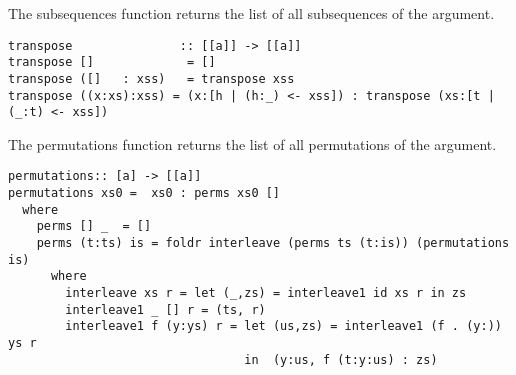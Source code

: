 The subsequences function returns the list of all subsequences of the argument.
\begin{lstlisting}[frame=single]
transpose               :: [[a]] -> [[a]]
transpose []             = []
transpose ([]   : xss)   = transpose xss
transpose ((x:xs):xss) = (x:[h | (h:_) <- xss]) : transpose (xs:[t | (_:t) <- xss])
\end{lstlisting}

The permutations function returns the list of all permutations of the argument.
\begin{lstlisting}[frame=single]
permutations:: [a] -> [[a]]
permutations xs0 =  xs0 : perms xs0 []
  where
    perms [] _  = []
    perms (t:ts) is = foldr interleave (perms ts (t:is)) (permutations is)
      where 
        interleave xs r = let (_,zs) = interleave1 id xs r in zs
        interleave1 _ [] r = (ts, r)
        interleave1 f (y:ys) r = let (us,zs) = interleave1 (f . (y:)) ys r
                                 in  (y:us, f (t:y:us) : zs)
\end{lstlisting}